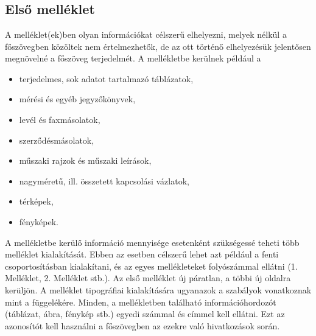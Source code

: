 \appendix
\chapter*{\melleklet}
\setcounter{chapter}{13}
\setcounter{section}{0}

\section{Első melléklet}

A melléklet(ek)ben olyan információkat célszerű elhelyezni, melyek nélkül a 
főszövegben közöltek nem értelmezhetők, de az ott történő elhelyezésük 
jelentősen megnövelné a főszöveg terjedelmét. A mellékletbe kerülnek például a

\begin{itemize}
  \item terjedelmes, sok adatot tartalmazó táblázatok,
  \item mérési és egyéb jegyzőkönyvek,
  \item levél és faxmásolatok,
  \item szerződésmásolatok,
  \item műszaki rajzok és műszaki leírások,
  \item nagyméretű, ill. összetett kapcsolási vázlatok,
  \item térképek,
  \item fényképek. 
\end{itemize}

A mellékletbe kerülő információ mennyisége esetenként szükségessé teheti több 
melléklet kialakítását. Ebben az esetben célszerű lehet azt például a fenti 
csoportosításban kialakítani, és az egyes mellékleteket folyószámmal ellátni 
(1. Melléklet, 2. Melléklet stb.). 
Az első melléklet új páratlan, a többi új oldalra kerüljön. 
A melléklet tipográfiai kialakítására ugyanazok a szabályok vonatkoznak mint a 
függelékére. 
Minden, a mellékletben található információhordozót (táblázat, ábra, 
fénykép stb.) egyedi számmal és címmel kell ellátni. Ezt az azonosítót kell 
használni a főszövegben az ezekre való hivatkozások során.

